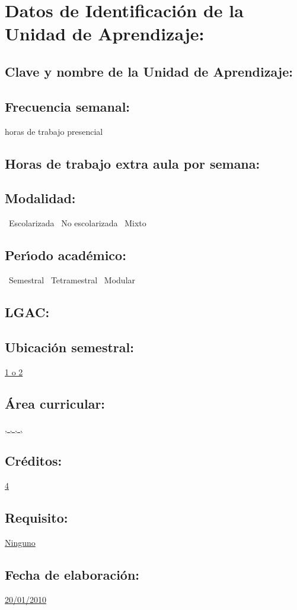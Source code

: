 \documentclass[10 pt]{article}
\begin{document}


\section{Datos de Identificaci\'{o}n de la Unidad de Aprendizaje:}
\subsection{Clave y nombre de la Unidad de Aprendizaje:} 
\subsection{Frecuencia semanal:} horas de trabajo presencial 
\subsection{Horas de trabajo extra aula por semana:} 
\subsection{Modalidad:} \yes~Escolarizada \no~No escolarizada \no~Mixto
\subsection{Per\'{\i}odo acad\'{e}mico:} \yes~Semestral
\no~Tetramestral \no~Modular
\subsection{LGAC:} \underline{\seys}
\subsection{Ubicaci\'{o}n semestral:} \underline{1 o 2}
\subsection{\'{A}rea curricular:} \underline{\fb, \fa, \da, \le, \inv}
\subsection{Cr\'{e}ditos:} \underline{4}
\subsection{Requisito:} \underline{Ninguno}
\subsection{Fecha de elaboraci\'{o}n:} \underline{20/01/2010}
\end{document}

